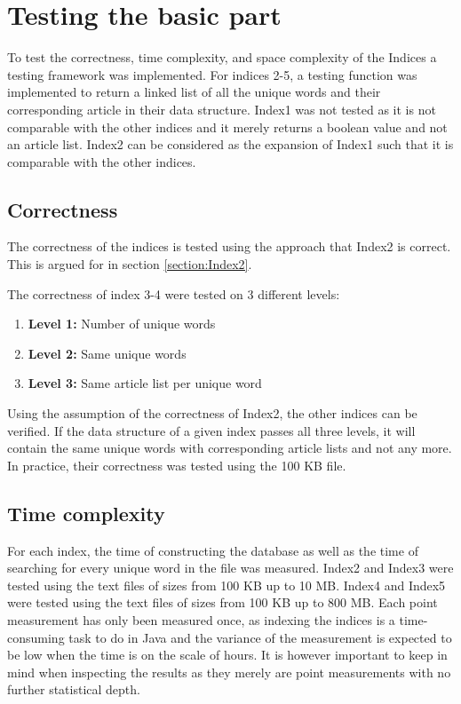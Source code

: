 \section{Testing the basic part}
To test the correctness, time complexity, and space complexity of the Indices a testing framework was implemented. For indices 2-5, a testing function was implemented to return a linked list of all the unique words and their corresponding article in their data structure. Index1 was not tested as it is not comparable with the other indices and it merely returns a boolean value and not an article list. Index2 can be considered as the expansion of Index1 such that it is comparable with the other indices.

\subsection{Correctness}
The correctness of the indices is tested using the approach that Index2 is correct. This is argued for in section \ref{section:Index2}.

The correctness of index 3-4 were tested on 3 different levels:

\begin{enumerate}
    \item[] \textbf{Level 1:} Number of unique words 
    \item[] \textbf{Level 2:} Same unique words
    \item[] \textbf{Level 3:} Same article list per unique word
\end{enumerate}

Using the assumption of the correctness of Index2, the other indices can be verified. If the data structure of a given index passes all three levels, it will contain the same unique words with corresponding article lists and not any more. In practice, their correctness was tested using the 100 KB file. 

\subsection{Time complexity}
For each index, the time of constructing the database as well as the time of searching for every unique word in the file was measured. Index2 and Index3 were tested using the text files of sizes from 100 KB up to 10 MB. Index4 and Index5 were tested using the text files of sizes from 100 KB up to 800 MB.
Each point measurement has only been measured once, as indexing the indices is a time-consuming task to do in Java and the variance of the measurement is expected to be low when the time is on the scale of hours. It is however important to keep in mind when inspecting the results as they merely are point measurements with no further statistical depth.   


